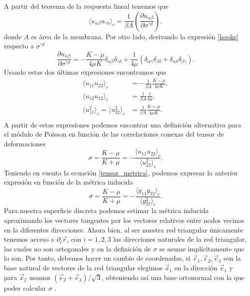 A partir del teorema de la respuesta lineal \cite{Binney:critical_phenomema}
tenemos que
\begin{equation*}
\langle u_{\alpha\beta}u_{\gamma\delta} \rangle_c
=\frac{1}{\beta A}\left(\frac{\partial u_{\alpha\beta}}{\partial \sigma^{\gamma\delta}}\right),
\end{equation*}
donde $A$ es área de la membrana. Por otro lado, derivando la expresión
\eqref{hooke} respecto a $\sigma^{\gamma\delta}$
\begin{equation*}
\frac{\partial u_{\alpha\beta}}{\partial
  \sigma^{\gamma\delta}}=-\frac{K-\mu}{4\mu K}\delta_{\alpha\beta}\delta_{\gamma\delta}+\frac{1}{4\mu}(\delta_{\alpha\gamma}\delta_{\beta\delta}+\delta_{\alpha\delta}\delta_{\beta\gamma}).
\end{equation*}
Usando estas dos últimas expresiones encontramos que 
\begin{align*}
\langle u_{11}u_{22} \rangle_c&=-\frac{1}{\beta A}\frac{K-\mu}{4\mu K},\\
\langle u_{12}u_{12} \rangle_c&=\frac{1}{\beta A}\frac{1}{4\mu},\\
\langle u_{11}^2 \rangle_c=\langle u_{22}^2 \rangle_c&=\frac{1}{\beta A}\frac{K+\mu}{4\mu K}.\\
\end{align*}
A partir de estas expresiones podemos encontrar una definición alternativa
para el módulo de Poisson \cite{Zang_Dmolecular,Parrinello_Crystal} en
función de las correlaciones conexas del tensor de deformaciones
\begin{equation*}
\sigma=\frac{K-\mu}{K+\mu}=-\frac{\langle u_{11}u_{22}
  \rangle_c}{\langle u_{22}^2 \rangle_c}.
\end{equation*}
Teniendo en cuenta la ecuación \eqref{tensor_metrica}, podemos expresar la anterior
expresión en función de la métrica inducida 
\begin{equation*}
\sigma=\frac{K-\mu}{K+\mu}=-\frac{\langle g_{11}g_{22}
  \rangle_c}{\langle g_{22}^2 \rangle_c}.
\end{equation*}
Para nuestra superficie discreta podemos estimar la métrica inducida
aproximando los vectores tangentes por los vectores relativos entre nodos
vecinos en la diferentes direcciones. Ahora bien, al ser nuestra red
triangular únicamente tenemos acceso a $\partial_i \vec{r}$, con $i=1,2,3$ las
direcciones naturales de la red triangular, las cuales no son ortogonales y en
la definición de $\sigma$ se asume implícitamente que lo son. Por tanto,
debemos hacer un cambio de coordenadas, si $\vec{e}_1,\vec{e}_2,\vec{e}_3$ son
la base natural de vectores de la red triangular elegimos
$\vec{x}_1$ en la dirección $\vec{e}_1$ y para $\vec{x}_2$ usamos
$(\vec{e}_2+\vec{e}_3)/\sqrt{3}$, obteniendo así una base ortonormal con la
que poder calcular $\sigma$ \cite{Bowick_poisson_ratio}.


